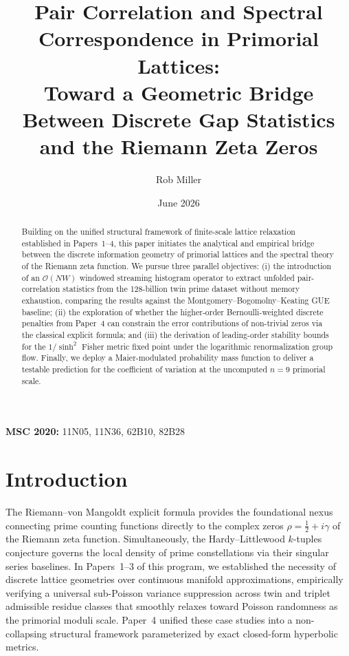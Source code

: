 \documentclass[11pt]{article}
\title{Pair Correlation and Spectral Correspondence in Primorial Lattices:\\
Toward a Geometric Bridge Between Discrete Gap Statistics and the Riemann Zeta Zeros}
\author{Rob Miller}
\date{June 2026}
\theoremstyle{remark}
\begin{document}
\maketitle

\begin{abstract}
Building on the unified structural framework of finite-scale lattice relaxation established in Papers~1--4, this paper initiates the analytical and empirical bridge between the discrete information geometry of primorial lattices and the spectral theory of the Riemann zeta function. We pursue three parallel objectives: (i) the introduction of an $\mathcal{O}(NW)$ windowed streaming histogram operator to extract unfolded pair-correlation statistics from the 128-billion twin prime dataset without memory exhaustion, comparing the results against the Montgomery--Bogomolny--Keating GUE baseline; (ii) the exploration of whether the higher-order Bernoulli-weighted discrete penalties from Paper~4 can constrain the error contributions of non-trivial zeros via the classical explicit formula; and (iii) the derivation of leading-order stability bounds for the $1/\sinh^2$ Fisher metric fixed point under the logarithmic renormalization group flow. Finally, we deploy a Maier-modulated probability mass function to deliver a testable prediction for the coefficient of variation at the uncomputed $n=9$ primorial scale.
\end{abstract}

\noindent \textbf{MSC 2020:} 11N05, 11N36, 62B10, 82B28

\section{Introduction}
The Riemann--von Mangoldt explicit formula provides the foundational nexus connecting prime counting functions directly to the complex zeros $\rho = \frac{1}{2} + i\gamma$ of the Riemann zeta function. Simultaneously, the Hardy--Littlewood $k$-tuples conjecture governs the local density of prime constellations via their singular series baselines. In Papers~1--3 of this program, we established the necessity of discrete lattice geometries over continuous manifold approximations, empirically verifying a universal sub-Poisson variance suppression across twin and triplet admissible residue classes that smoothly relaxes toward Poisson randomness as the primorial moduli scale. Paper~4 unified these case studies into a non-collapsing structural framework parameterized by exact closed-form hyperbolic metrics.
\end{document}
